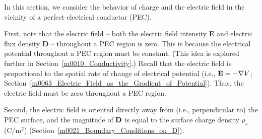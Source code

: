 

\label{m0025_Charge_and_Electric_Field_for_a_Perfectly_Conducting_Region} %

In this section, we consider the behavior of charge and the electric field in the vicinity of a perfect electrical conductor (PEC).

First, note that the electric field -- both the electric field intensity {\bf E} and electric flux density {\bf D} -- throughout a PEC region is zero.
This is because the electrical potential throughout a PEC region must be constant.
(This idea is explored further in Section~\ref{m0010_Conductivity}.)
Recall that the electric field is proportional to the spatial rate of change of electrical potential (i.e., ${\bf E}=-\nabla V$; Section~\ref{m0063_Electric_Field_as_the_Gradient_of_Potential}).
Thus, the electric field must be zero throughout a PEC region.

Second, 
the electric field is oriented directly away from (i.e., perpendicular to) the PEC surface, and the magnitude of ${\bf D}$ is equal to the surface charge density $\rho_s$ (C/m$^2$) (Section~\ref{m0021_Boundary_Conditions_on_D}). 


